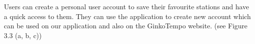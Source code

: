 \documentclass[a4paper, 12pt]{report}
\begin{document}
Users can create a personal user account to save their favourite stations and have a quick access to them. They can use the application to create new account which can be used on our application and also on the GinkoTempo website. (see Figure 3.3 (a, b, c))

\begin{figure}[!hp]
  \centering

\end{figure}
\end{document}
